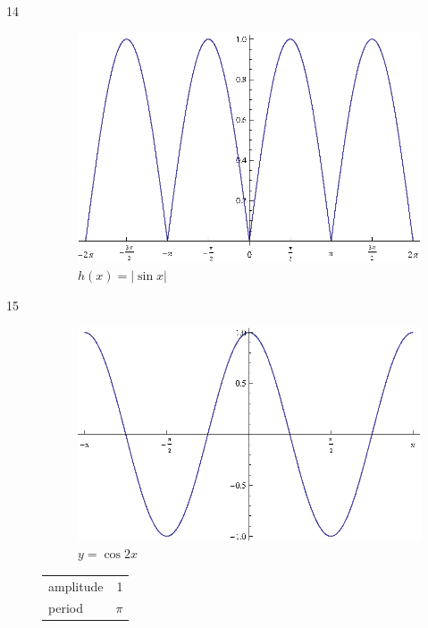 \documentclass{exam}
\begin{document}
\begin{description}
      \item[14]
        \begin{figure}[H]
          \centering
          \includegraphics[scale=0.9]{exercise14.eps}
          \caption{$h(x) = | \sin x |$}
        \end{figure}

      \item[15]
        \begin{figure}[H]
          \centering
          \includegraphics[scale=0.8]{exercise15.eps}
          \caption{$y = \cos 2x$}
        \end{figure}

        \begin{tabular}[H]{lr}
          \toprule
          amplitude & 1 \\
          period    & $\pi$ \\
          \bottomrule
        \end{tabular}


\end{description}
\end{document}
